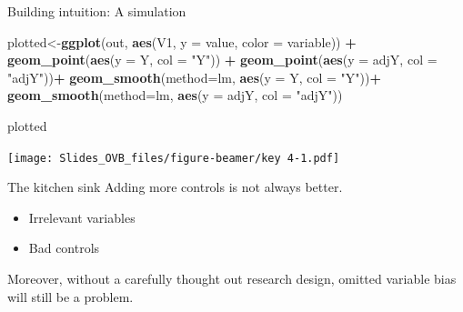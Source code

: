 \documentclass[
  ignorenonframetext,
]{beamer}
\newenvironment{Shaded}{\begin{snugshade}}{\end{snugshade}}
\newcommand{\DataTypeTok}[1]{\textcolor[rgb]{0.13,0.29,0.53}{#1}}
\newcommand{\KeywordTok}[1]{\textcolor[rgb]{0.13,0.29,0.53}{\textbf{#1}}}
\newcommand{\NormalTok}[1]{#1}
\newcommand{\OperatorTok}[1]{\textcolor[rgb]{0.81,0.36,0.00}{\textbf{#1}}}
\newcommand{\StringTok}[1]{\textcolor[rgb]{0.31,0.60,0.02}{#1}}
\begin{document}
\begin{frame}[fragile]{Building intuition: A simulation}
\protect\hypertarget{building-intuition-a-simulation-6}{}
\tiny

\begin{Shaded}
\begin{Highlighting}[]
\NormalTok{plotted\textless{}{-}}\KeywordTok{ggplot}\NormalTok{(out, }\KeywordTok{aes}\NormalTok{(V1, }\DataTypeTok{y =}\NormalTok{ value, }\DataTypeTok{color =}\NormalTok{ variable)) }\OperatorTok{+}\StringTok{ }
\StringTok{    }\KeywordTok{geom\_point}\NormalTok{(}\KeywordTok{aes}\NormalTok{(}\DataTypeTok{y =}\NormalTok{ Y, }\DataTypeTok{col =} \StringTok{"Y"}\NormalTok{)) }\OperatorTok{+}\StringTok{ }
\StringTok{    }\KeywordTok{geom\_point}\NormalTok{(}\KeywordTok{aes}\NormalTok{(}\DataTypeTok{y =}\NormalTok{ adjY, }\DataTypeTok{col =} \StringTok{"adjY"}\NormalTok{))}\OperatorTok{+}
\StringTok{    }\KeywordTok{geom\_smooth}\NormalTok{(}\DataTypeTok{method=}\StringTok{\textquotesingle{}lm\textquotesingle{}}\NormalTok{, }\KeywordTok{aes}\NormalTok{(}\DataTypeTok{y =}\NormalTok{ Y, }\DataTypeTok{col =} \StringTok{"Y"}\NormalTok{))}\OperatorTok{+}
\StringTok{    }\KeywordTok{geom\_smooth}\NormalTok{(}\DataTypeTok{method=}\StringTok{\textquotesingle{}lm\textquotesingle{}}\NormalTok{, }\KeywordTok{aes}\NormalTok{(}\DataTypeTok{y =}\NormalTok{ adjY, }\DataTypeTok{col =} \StringTok{"adjY"}\NormalTok{))}

\NormalTok{plotted}
\end{Highlighting}
\end{Shaded}

\texttt{[image: Slides\_OVB\_files/figure-beamer/key 4-1.pdf]}

\normalsize
\end{frame}

\begin{frame}{The kitchen sink}
\protect\hypertarget{the-kitchen-sink}{}
Adding more controls is not always better.

\begin{itemize}
\item
  Irrelevant variables
\item
  Bad controls
\end{itemize}

Moreover, without a carefully thought out research design, omitted
variable bias will still be a problem.
\end{frame}
\end{document}
